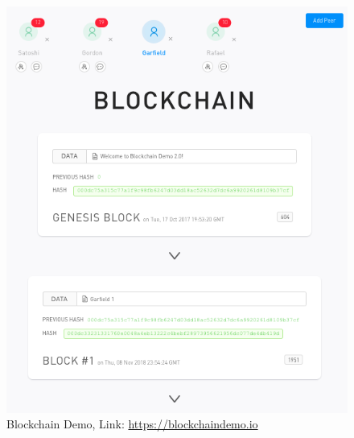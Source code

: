 \documentclass[journal, a4paper]{IEEEtran}
\begin{document}
\begin{figure}[!hbt]
		\begin{center}
		\includegraphics[width=\columnwidth]{blockchaindemo.png}
		\caption{Blockchain Demo, Link: \href{https://blockchaindemo.io}{https://blockchaindemo.io}}
		\label{fig:demo}
		\end{center}
	\end{figure}
\end{document}
